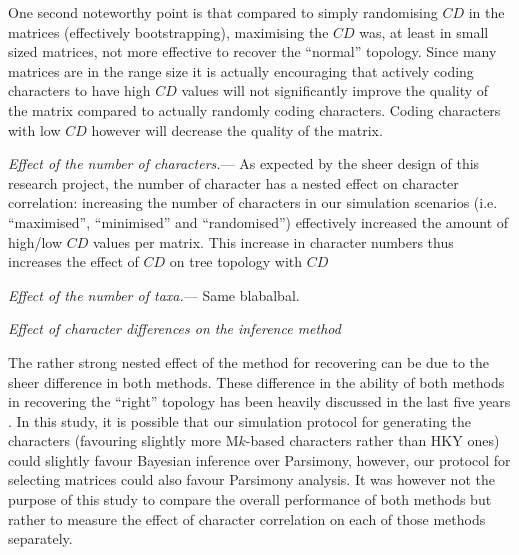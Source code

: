 \documentclass[12pt,letterpaper]{article}
\renewcommand{\subsection}[1]{%
\bigskip
\begin{center}
\begin{large}
\normalfont\itshape #1
\end{large}
\end{center}}
\renewcommand{\subsubsection}[1]{%
\vspace{2ex}
\noindent
\textit{#1.}---}
\begin{document}
One second noteworthy point is that compared to simply randomising $CD$ in the matrices (effectively bootstrapping), maximising the $CD$ was, at least in small sized matrices, not more effective to recover the ``normal'' topology.
Since many matrices are in the range size \citep{guillerme2016assessment} it is actually encouraging that actively coding characters to have high $CD$ values will not significantly improve the quality of the matrix compared to actually randomly coding characters.
Coding characters with low $CD$ however will decrease the quality of the matrix.

\subsubsection{Effect of the number of characters}
As expected by the sheer design of this research project, the number of character has a nested effect on character correlation: increasing the number of characters in our simulation scenarios (i.e. ``maximised'', ``minimised'' and ``randomised'') effectively increased the amount of high/low $CD$ values per matrix.
This increase in character numbers thus increases the effect of $CD$ on tree topology with $CD$

\subsubsection{Effect of the number of taxa}
Same blabalbal.

\subsection{Effect of character differences on the inference method}
The rather strong nested effect of the method for recovering can be due to the sheer difference in both methods.
These difference in the ability of both methods in recovering the ``right'' topology has been heavily discussed in the last five years \citep{spencerefficacy2013,wrightbayesian2014,OReilly20160081,puttick2017uncertain,goloboff2017weighted}.
In this study, it is possible that our simulation protocol for generating the characters (favouring slightly more M$k$-based characters rather than HKY ones) could slightly favour Bayesian inference over Parsimony, however, our protocol for selecting matrices \citep[those resulting in a $CI>0.26$ in a quick parsimony search;]{OReilly20160081} could also favour Parsimony analysis.
It was however not the purpose of this study to compare the overall performance of both methods but rather to measure the effect of character correlation on each of those methods separately.
\end{document}
